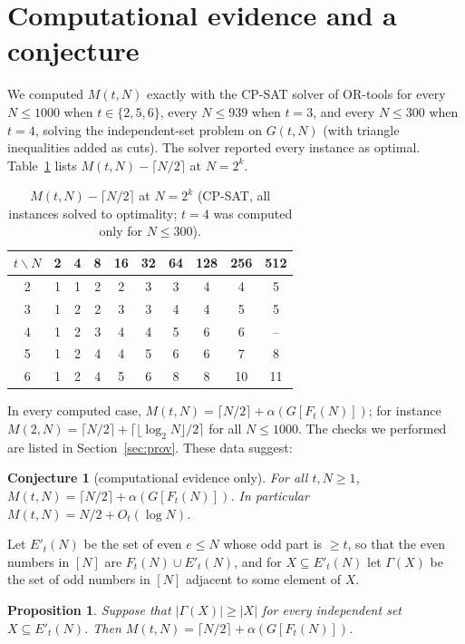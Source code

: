 \documentclass[11pt]{amsart}
\newtheorem{proposition}[lemma]{Proposition}
\newtheorem{conjecture}[lemma]{Conjecture}
\theoremstyle{definition}
\theoremstyle{remark}
\begin{document}
\section{Computational evidence and a conjecture}

We computed $M(t,N)$ exactly with the CP-SAT solver of OR-tools for every $N\le1000$ when $t\in\{2,5,6\}$, every $N\le939$ when $t=3$, and every $N\le300$ when $t=4$, solving the independent-set problem on $G(t,N)$ (with triangle inequalities added as cuts). The solver reported every instance as optimal. Table~\ref{tab:excess} lists $M(t,N)-\lceil N/2\rceil$ at $N=2^k$.

\begin{table}[ht]
\centering
\begin{tabular}{c|ccccccccc}
$t\backslash N$ & 2 & 4 & 8 & 16 & 32 & 64 & 128 & 256 & 512\\\hline
2 & 1 & 1 & 2 & 2 & 3 & 3 & 4 & 4 & 5\\
3 & 1 & 2 & 2 & 3 & 3 & 4 & 4 & 5 & 5\\
4 & 1 & 2 & 3 & 4 & 4 & 5 & 6 & 6 & --\\
5 & 1 & 2 & 4 & 4 & 5 & 6 & 6 & 7 & 8\\
6 & 1 & 2 & 4 & 5 & 6 & 8 & 8 & 10 & 11
\end{tabular}
\caption{$M(t,N)-\lceil N/2\rceil$ at $N=2^k$ (CP-SAT, all instances solved to optimality; $t=4$ was computed only for $N\le300$).}
\label{tab:excess}
\end{table}

In every computed case, $M(t,N)=\lceil N/2\rceil+\alpha(G[F_t(N)])$; for instance $M(2,N)=\lceil N/2\rceil+\lceil\lfloor\log_2N\rfloor/2\rceil$ for all $N\le1000$. The checks we performed are listed in Section~\ref{sec:prov}. These data suggest:

\begin{conjecture}[computational evidence only]\label{conj}
For all $t,N\ge1$, $M(t,N)=\lceil N/2\rceil+\alpha(G[F_t(N)])$. In particular $M(t,N)=N/2+O_t(\log N)$.
\end{conjecture}

Let $E'_t(N)$ be the set of even $e\le N$ whose odd part is $\ge t$, so that the even numbers in $[N]$ are $F_t(N)\cup E'_t(N)$, and for $X\subseteq E'_t(N)$ let $\Gamma(X)$ be the set of odd numbers in $[N]$ adjacent to some element of $X$.

\begin{proposition}\label{prop:hall}
Suppose that $|\Gamma(X)|\ge|X|$ for every independent set $X\subseteq E'_t(N)$. Then $M(t,N)=\lceil N/2\rceil+\alpha(G[F_t(N)])$.
\end{proposition}
\end{document}
